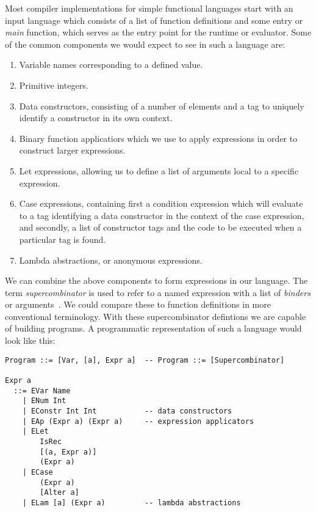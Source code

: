 Most compiler implementations for simple functional languages start with an 
input language which consists of a list of function definitions and some entry
or \emph{main} function, which serves as the entry point for the runtime or evaluator.
Some of the common components we would expect to see in such a language are:

\begin{enumerate}
	\item Variable names corresponding to a defined value.
	\item Primitive integers.
	\item Data constructors, consisting of a number of elements and a 
		  tag to uniquely identify a constructor in its own context.
	\item Binary function applicatiors which we use to apply expressions in order
		  to construct larger expressions.
	\item Let expressions, allowing us to define a list of arguments local
		  to a specific expression.
	\item Case expressions, containing first a condition expression which
		  will evaluate to a tag identifying a data constructor in the context
		  of the case expression, and secondly, a list of constructor tags and 
		  the code to be executed when a particular tag is found.
	\item Lambda abstractions, or anonymous expressions. 
\end{enumerate}

\noindent We can combine the above components to form expressions in our language. The
term \emph{supercombinator} is used to refer to a named expression with a 
list of \emph{binders} or arguments~\cite[pp.12]{Tutorial}. We could compare these to function 
definitions in more conventional terminology. With these supercombinator
defintions we are capable of building programs. A programmatic representation
of such a language would look like this:

\begin{verbatim}
Program ::= [Var, [a], Expr a] 	-- Program ::= [Supercombinator]

Expr a
  ::= EVar Name
    | ENum Int
    | EConstr Int Int 			-- data constructors
    | EAp (Expr a) (Expr a) 	-- expression applicators
    | ELet 
        IsRec
        [(a, Expr a)]
        (Expr a)
    | ECase
        (Expr a)
        [Alter a]
    | ELam [a] (Expr a) 		-- lambda abstractions
\end{verbatim}

